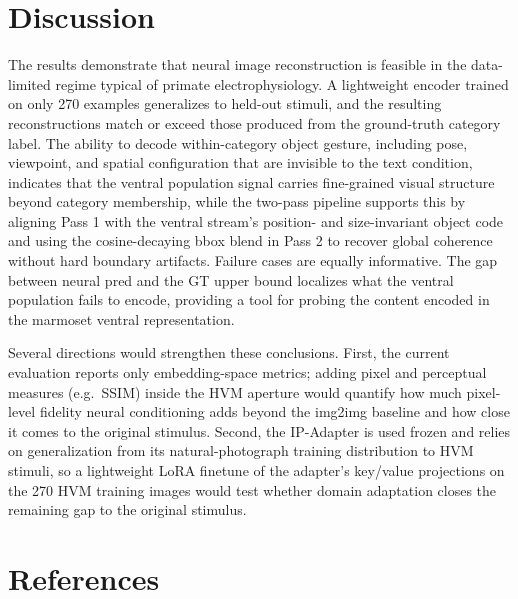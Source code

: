 \documentclass[10pt]{article}
\begin{document}
\section{Discussion}

The results demonstrate that neural image reconstruction is feasible in the data-limited regime typical of primate electrophysiology. A lightweight encoder trained on only 270 examples generalizes to held-out stimuli, and the resulting reconstructions match or exceed those produced from the ground-truth category label. The ability to decode within-category object gesture, including pose, viewpoint, and spatial configuration that are invisible to the text condition, indicates that the ventral population signal carries fine-grained visual structure beyond category membership, while the two-pass pipeline supports this by aligning Pass 1 with the ventral stream's position- and size-invariant object code and using the cosine-decaying bbox blend in Pass 2 to recover global coherence without hard boundary artifacts. Failure cases are equally informative. The gap between neural pred and the GT upper bound localizes what the ventral population fails to encode, providing a tool for probing the content encoded in the marmoset ventral representation.

Several directions would strengthen these conclusions. First, the current evaluation reports only embedding-space metrics; adding pixel and perceptual measures (e.g.\ SSIM) inside the HVM aperture would quantify how much pixel-level fidelity neural conditioning adds beyond the img2img baseline and how close it comes to the original stimulus. Second, the IP-Adapter is used frozen and relies on generalization from its natural-photograph training distribution to HVM stimuli, so a lightweight LoRA finetune of the adapter's key/value projections on the 270 HVM training images would test whether domain adaptation closes the remaining gap to the original stimulus.

\section*{References}
\end{document}
